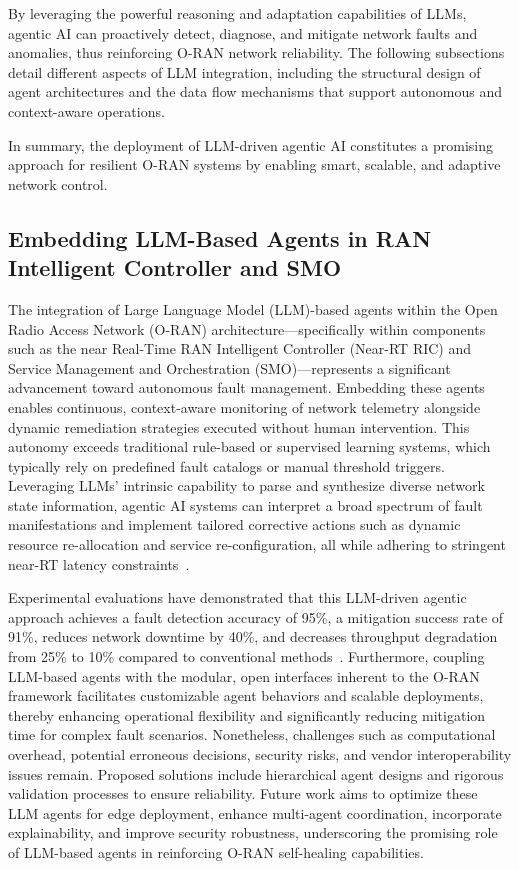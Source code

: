 \documentclass[sigconf]{acmart}
\begin{document}
By leveraging the powerful reasoning and adaptation capabilities of LLMs, agentic AI can proactively detect, diagnose, and mitigate network faults and anomalies, thus reinforcing O-RAN network reliability. The following subsections detail different aspects of LLM integration, including the structural design of agent architectures and the data flow mechanisms that support autonomous and context-aware operations.

In summary, the deployment of LLM-driven agentic AI constitutes a promising approach for resilient O-RAN systems by enabling smart, scalable, and adaptive network control.

\subsection{Embedding LLM-Based Agents in RAN Intelligent Controller and SMO}

The integration of Large Language Model (LLM)-based agents within the Open Radio Access Network (O-RAN) architecture—specifically within components such as the near Real-Time RAN Intelligent Controller (Near-RT RIC) and Service Management and Orchestration (SMO)—represents a significant advancement toward autonomous fault management. Embedding these agents enables continuous, context-aware monitoring of network telemetry alongside dynamic remediation strategies executed without human intervention. This autonomy exceeds traditional rule-based or supervised learning systems, which typically rely on predefined fault catalogs or manual threshold triggers. Leveraging LLMs’ intrinsic capability to parse and synthesize diverse network state information, agentic AI systems can interpret a broad spectrum of fault manifestations and implement tailored corrective actions such as dynamic resource re-allocation and service re-configuration, all while adhering to stringent near-RT latency constraints~\cite{ref55}.

Experimental evaluations have demonstrated that this LLM-driven agentic approach achieves a fault detection accuracy of 95\%, a mitigation success rate of 91\%, reduces network downtime by 40\%, and decreases throughput degradation from 25\% to 10\% compared to conventional methods~\cite{ref55}. Furthermore, coupling LLM-based agents with the modular, open interfaces inherent to the O-RAN framework facilitates customizable agent behaviors and scalable deployments, thereby enhancing operational flexibility and significantly reducing mitigation time for complex fault scenarios. Nonetheless, challenges such as computational overhead, potential erroneous decisions, security risks, and vendor interoperability issues remain. Proposed solutions include hierarchical agent designs and rigorous validation processes to ensure reliability. Future work aims to optimize these LLM agents for edge deployment, enhance multi-agent coordination, incorporate explainability, and improve security robustness, underscoring the promising role of LLM-based agents in reinforcing O-RAN self-healing capabilities.
\end{document}
